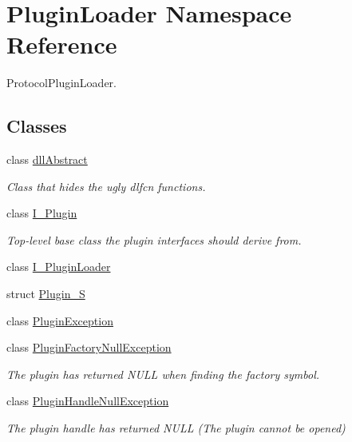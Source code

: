 \hypertarget{namespacePluginLoader}{}\section{Plugin\+Loader Namespace Reference}
\label{namespacePluginLoader}


Protocol\+Plugin\+Loader.  


\subsection*{Classes}
\begin{DoxyCompactItemize}
\item 
class \mbox{\hyperlink{classPluginLoader_1_1dllAbstract}{dll\+Abstract}}
\begin{DoxyCompactList}\small\item\em Class that hides the ugly dlfcn functions. \end{DoxyCompactList}\item 
class \mbox{\hyperlink{classPluginLoader_1_1I__Plugin}{I\+\_\+\+Plugin}}
\begin{DoxyCompactList}\small\item\em Top-\/level base class the plugin interfaces should derive from. \end{DoxyCompactList}\item 
class \mbox{\hyperlink{classPluginLoader_1_1I__PluginLoader}{I\+\_\+\+Plugin\+Loader}}
\item 
struct \mbox{\hyperlink{structPluginLoader_1_1Plugin__S}{Plugin\+\_\+S}}
\item 
class \mbox{\hyperlink{classPluginLoader_1_1PluginException}{Plugin\+Exception}}
\item 
class \mbox{\hyperlink{classPluginLoader_1_1PluginFactoryNullException}{Plugin\+Factory\+Null\+Exception}}
\begin{DoxyCompactList}\small\item\em The plugin has returned N\+U\+LL when finding the factory symbol. \end{DoxyCompactList}\item 
class \mbox{\hyperlink{classPluginLoader_1_1PluginHandleNullException}{Plugin\+Handle\+Null\+Exception}}
\begin{DoxyCompactList}\small\item\em The plugin handle has returned N\+U\+LL (The plugin cannot be opened) \end{DoxyCompactList}\item 

\end{DoxyCompactItemize}
